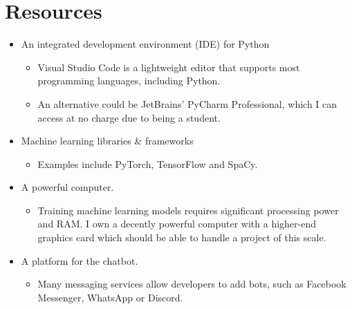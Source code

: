 \documentclass[12pt]{report}
\begin{document}
    \section{Resources}
    \begin{itemize}
        \item An integrated development environment (IDE) for Python
        \begin{itemize}
            \item Visual Studio Code is a lightweight editor that supports most programming languages,
            including Python.
            \item An alternative could be JetBrains' PyCharm Professional, which I can access at no charge due
            to being a student.
        \end{itemize}

        \item Machine learning libraries \& frameworks
        \begin{itemize}
            \item Examples include PyTorch, TensorFlow and SpaCy.
        \end{itemize}

        \item A powerful computer.
        \begin{itemize}
            \item Training machine learning models requires significant processing power and RAM. I own a decently 
            powerful computer with a higher-end graphics card which should be able to handle a project of
            this scale.
        \end{itemize}

        \item A platform for the chatbot.
        \begin{itemize}
            \item Many messaging services allow developers to add bots, such as Facebook Messenger, WhatsApp or
            Discord.
        \end{itemize}

    \end{itemize}
\end{document}
